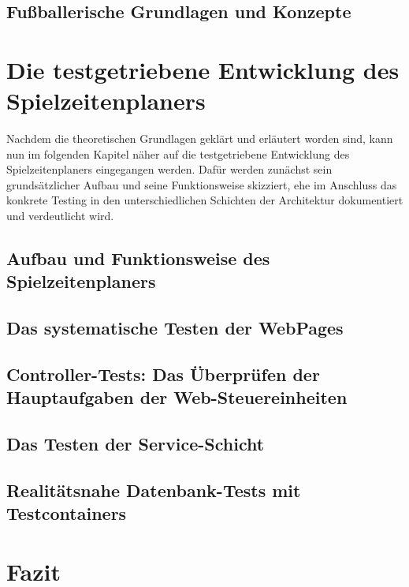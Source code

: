 \subsection{Fußballerische Grundlagen und Konzepte}




\section{Die testgetriebene Entwicklung des Spielzeitenplaners}

Nachdem die theoretischen Grundlagen geklärt und erläutert worden sind, kann nun 
im folgenden Kapitel näher auf die testgetriebene Entwicklung des 
Spielzeitenplaners eingegangen werden. Dafür werden zunächst sein grundsätzlicher 
Aufbau und seine Funktionsweise skizziert, ehe im Anschluss das konkrete Testing 
in den unterschiedlichen Schichten der Architektur dokumentiert und verdeutlicht 
wird. 


\subsection{Aufbau und Funktionsweise des Spielzeitenplaners}




\subsection{Das systematische Testen der WebPages}




\subsection{Controller-Tests: Das Überprüfen der Hauptaufgaben der Web-Steuereinheiten}




\subsection{Das Testen der Service-Schicht}




\subsection{Realitätsnahe Datenbank-Tests mit Testcontainers}



\clearpage


\section{Fazit}



